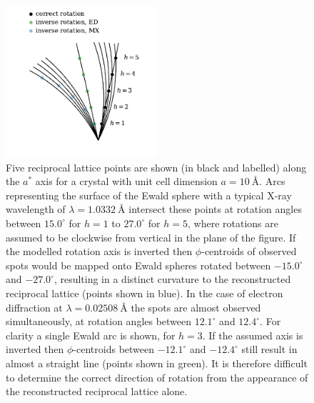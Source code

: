 \documentclass[preprint]{iucr}
\begin{document}
\begin{figure}
  \label{fig:invert_axis}
  \centering
  \caption{
    Five reciprocal lattice points are shown (in black and labelled) along the
    $a^*$ axis for a crystal with unit cell dimension $a=\SI{10}{\angstrom}$.
    Arcs representing the surface of the Ewald sphere with a typical X-ray
    wavelength of $\lambda=\SI{1.0332}{\angstrom}$ intersect these points at
    rotation angles between $15.0^\circ$ for $h=1$ to $27.0^\circ$ for $h=5$,
    where rotations are assumed to be clockwise from vertical in the plane of
    the figure. If the modelled rotation axis is inverted then $\phi$-centroids
    of observed spots would be mapped onto Ewald spheres rotated between
    $-15.0^\circ$ and $-27.0^\circ$, resulting in a distinct curvature to the
    reconstructed reciprocal lattice (points shown in blue). In the case of
    electron diffraction at $\lambda=\SI{0.02508}{\angstrom}$ the spots are
    almost observed simultaneously, at rotation angles between $12.1^\circ$ and
    $12.4^\circ$. For clarity a single Ewald arc is shown, for $h=3$. If the
    assumed axis is inverted then $\phi$-centroids between $-12.1^\circ$ and
    $-12.4^\circ$ still result in almost a straight line (points shown in
    green). It is therefore difficult to determine the correct direction of
    rotation from the appearance of the reconstructed reciprocal lattice alone.
  }
  \includegraphics[width=0.5\textwidth]{Figures/relps_inverted_axis.pdf}
\end{figure}
\end{document}
